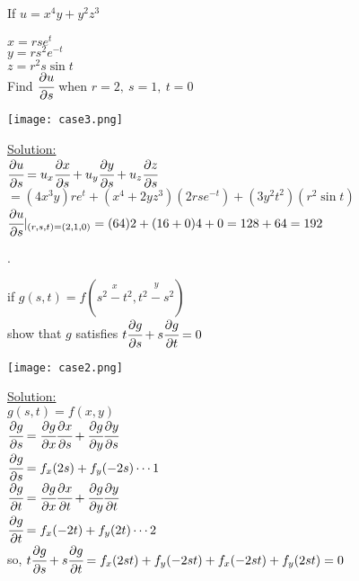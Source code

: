\noindent{\color{smalt(darkpowderblue)}\rule{\linewidth}{.2mm}}
\begin{example}
If $u=x^4 y+y^2 z^3$\\
\noindent\begin{minipage}{0.5\textwidth}
$x=r s e^t$\\
$y=rs^2 e^{-t}$\\
$z=r^2 s \sin{t}$\\
Find $\cfrac{\partial u}{\partial s}$ when $r=2,~s=1,~t=0$\\
\end{minipage}
\noindent\begin{minipage}{0.5\textwidth}
\begin{center}
   \texttt{[image: case3.png]}\\
\end{center}\end{minipage}
{\color{smalt(darkpowderblue)}\underline{Solution:}}\\
$\cfrac{\partial u}{\partial s}=u_x\cfrac{\partial x}{\partial s}+u_y\cfrac{\partial y}{\partial s}+u_z\cfrac{\partial z}{\partial s}$\\
$=(4x^3 y)r e^t+(x^4+2y z^3)(2r s e^{-t})+(3y^2t^2)(r^2\sin{t})$\\
$\cfrac{\partial u}{\partial s}|_{(r,s,t)=(2,1,0)}=(64)2+(16+0)4+0=128+64=192$
\end{example}
\noindent{\color{smalt(darkpowderblue)}\rule{\linewidth}{.2mm}}
\begin{example}.\\
\noindent\begin{minipage}{0.5\textwidth}
if $g(s,t)=f(\overset{x}{s^2-t^2},\overset{y}{t^2-s^2})$\\
show that $g$ satisfies $t\cfrac{\partial g}{\partial s}+s\cfrac{\partial g}{\partial t}=0$\\
\end{minipage}
\noindent\begin{minipage}{0.5\textwidth}
\begin{center}
   \texttt{[image: case2.png]}\\
\end{center}\end{minipage}
{\color{smalt(darkpowderblue)}\underline{Solution:}}\\
$g(s,t)=f(x,y)$\\
$\cfrac{\partial g}{\partial s}=\cfrac{\partial g}{\partial x}\cfrac{\partial x}{\partial s}+\cfrac{\partial g}{\partial y}\cfrac{\partial y}{\partial s}$\\
$\cfrac{\partial g}{\partial s}=f_x(2s)+f_y(-2s)\cdots 1$\\
$\cfrac{\partial g}{\partial t}=\cfrac{\partial g}{\partial x}\cfrac{\partial x}{\partial t}+\cfrac{\partial g}{\partial y}\cfrac{\partial y}{\partial t}$\\
$\cfrac{\partial g}{\partial t}=f_x(-2t)+f_y(2t)\cdots 2$\\
so, $t\cfrac{\partial g}{\partial s}+s\cfrac{\partial g}{\partial t}=f_x(2st)+f_y(-2st)+f_x(-2st)+f_y(2st)=0$\\
\end{example}
